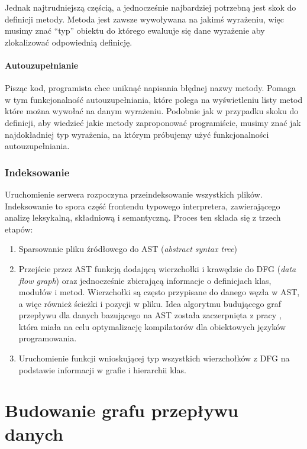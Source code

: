 \documentclass[shortabstract,mgr]{iithesis}
\begin{document}
Jednak najtrudniejszą częścią, a jednocześnie najbardziej potrzebną jest skok do definicji metody. Metoda jest zawsze wywoływana na jakimś wyrażeniu, więc musimy znać \enquote{typ} obiektu do którego ewaluuje się dane wyrażenie aby zlokalizować odpowiednią definicję.

\subsubsection{Autouzupełnianie}

Pisząc kod, programista chce uniknąć napisania błędnej nazwy metody. Pomaga w tym funkcjonalność autouzupełniania, które polega na wyświetleniu listy metod które można wywołać na danym wyrażeniu. Podobnie jak w przypadku skoku do definicji, aby wiedzieć jakie metody zaproponować programiście, musimy znać jak najdokładniej typ wyrażenia, na którym próbujemy użyć funkcjonalności autouzupełniania.

\subsection{Indeksowanie}

Uruchomienie serwera rozpoczyna przeindeksowanie wszystkich plików. Indeksowanie to spora część frontendu typowego interpretera, zawierającego analizę leksykalną, składniową i semantyczną. Proces ten składa się z trzech etapów:
\begin{enumerate}
\item Sparsowanie pliku źródłowego do AST (\textit{abstract syntax tree})
\item Przejście przez AST funkcją dodającą wierzchołki i krawędzie do DFG (\textit{data flow graph}) oraz jednocześnie zbierającą informacje o definicjach klas, modułów i metod. Wierzchołki są często przypisane do danego węzła w AST, a więc również ścieżki i pozycji w pliku. Idea algorytmu budującego graf przepływu dla danych bazującego na AST została zaczerpnięta z pracy \citet*{FICA}, która miała na celu optymalizację kompilatorów dla obiektowych języków programowania.
\item Uruchomienie funkcji wnioskującej typ wszystkich wierzchołków z DFG na podstawie informacji w grafie i hierarchii klas.
\end{enumerate}

\chapter{Budowanie grafu przepływu danych}
\end{document}

